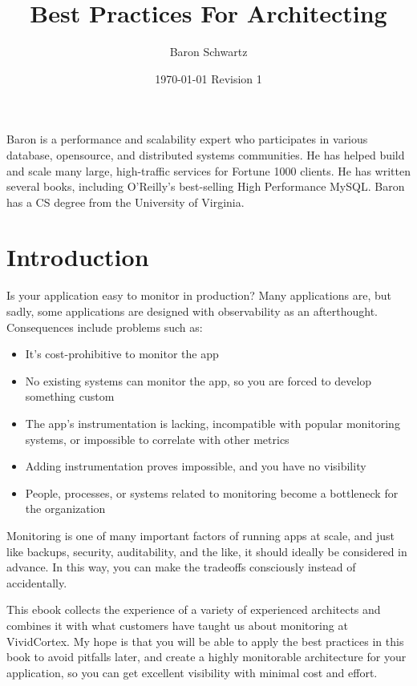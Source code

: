 \documentclass{vivid_layout}
\title{Best Practices For Architecting}{\fontsize{30pt}{15pt}\selectfont Highly Monitorable Applications}
\date{\color{white} \today{} \textbullet{} Revision 1}
\author{Baron Schwartz}{img/baron}
\begin{document}
\maketitle		%
\begin{bio}		%
Baron is a performance and scalability expert who participates in various
database, opensource, and distributed systems communities. He has helped build
and scale many large, high-traffic services for Fortune 1000 clients. He has
written several books, including O'Reilly's best-selling High Performance MySQL.
Baron has a CS degree from the University of Virginia.
\end{bio}
\tableofcontents	%

\section{Introduction}

Is your application easy to monitor in production? Many applications are, but
sadly, some applications are designed with observability as an afterthought.
Consequences include problems such as:

\begin{itemize}
\item It's cost-prohibitive to monitor the app
\item No existing systems can monitor the app, so you are forced to develop
something custom
\item The app's instrumentation is lacking, incompatible with popular monitoring
systems, or impossible to correlate with other metrics
\item Adding instrumentation proves impossible, and you have no visibility
\item People, processes, or systems related to monitoring become a bottleneck for the organization
\end{itemize}

Monitoring is one of many important factors of running apps at scale, and just
like backups, security, auditability, and the like, it should ideally be
considered in advance. In this way, you can make the tradeoffs consciously instead
of accidentally.

This ebook collects the experience of a variety of experienced architects and
combines it with what customers have taught us about monitoring at
VividCortex. My hope is that you will be able to apply the best practices in
this book to avoid pitfalls later, and create a highly monitorable
architecture for your application, so you can get excellent visibility with
minimal cost and effort. 
\end{document}
